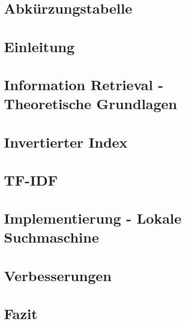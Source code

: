 \documentclass[12pt, a4paper]{scrreprt}
\renewcommand{\headrulewidth}{0.2pt}
\renewcommand{\headrulewidth}{0pt}
\begin{document}
	\chapter*{Abkürzungstabelle}
	\label{abkürzung}
	
	\thispagestyle{empty}
	\pagestyle{fancy}
	\begin{spacing}{1.5}	
		\chapter{Einleitung}
		\label{einleitung}
		
		\chapter{Information Retrieval - Theoretische Grundlagen}
		\label{grundlagen}
		
		\chapter{Invertierter Index}
		\label{invertindex}
		
		\chapter{TF-IDF}
		\label{tfidf}
		
		\chapter{Implementierung - Lokale Suchmaschine}
		\label{impl}
		
		\chapter{Verbesserungen}
		\label{improvements}
		
		\chapter{Fazit}
		\label{fazit}
		
	\end{spacing}
	\newpage
	\fancypagestyle{plain}{
		\fancyhf{}
		\renewcommand{\headrulewidth}{0pt}
		\lfoot{}
		\cfoot{\thepage}
		\rfoot{}
	}
	\pagestyle{plain}
	\printbibliography
\end{document}
